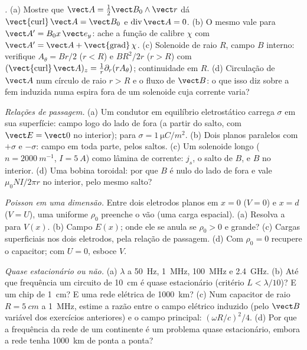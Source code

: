 \begin{exercise}[$\star\star$]\label{exo:b2:maxwell-equations:5}
\emph{.} (a) Mostre que $\vect A = \tfrac12\vect B_0\wedge\vect r$
dá $\operatorname{\vect{curl}}\vect A = \vect B_0$ e $\operatorname{div}\vect A = 0$.
(b) O mesmo vale para $\vect A' = B_0x\,\vect e_y$: ache a função de calibre $\chi$ com
$\vect A' = \vect A + \operatorname{\vect{grad}}\chi$. (c) Solenoide de raio $R$,
campo $B$ interno: verifique $A_\theta = Br/2$ ($r < R$) e $BR^2/2r$ ($r > R$)
com $(\operatorname{\vect{curl}}\vect A)_z = \frac1r\partial_r(rA_\theta)$; continuidade em $R$.
(d) Circulação de $\vect A$ num círculo de raio $r > R$ e o fluxo de
$\vect B$: o que isso diz sobre a fem induzida numa espira fora de um
solenoide cuja corrente varia?
\end{exercise}

\begin{exercise}[$\star\star$]\label{exo:b2:maxwell-equations:6}
\emph{Relações de passagem.} (a) Um condutor em equilíbrio
eletrostático carrega $\sigma$ em sua superfície: campo logo do lado de fora (a partir do
salto, com $\vect E = \vect 0$ no interior); para $\sigma = \qty{1}{\micro C/m^2}$. (b) Dois
planos paralelos com $+\sigma$ e $-\sigma$: campo em toda parte, pelos saltos.
(c) Um solenoide longo ($n = \qty{2000}{m^{-1}}$, $I = \qty{5}{A}$) como lâmina de
corrente: $j_s$, o salto de $B$, e $B$ no interior. (d) Uma bobina toroidal: por que $B$ é
nulo do lado de fora e vale $\mu_0NI/2\pi r$ no interior, pelo mesmo salto?
\end{exercise}

\begin{exercise}[$\star\star$]\label{exo:b2:maxwell-equations:7}
\emph{Poisson em uma dimensão.} Entre dois eletrodos planos em $x = 0$
($V = 0$) e $x = d$ ($V = U$), uma  uniforme $\rho_0$ preenche o
vão (uma carga espacial). (a) Resolva a  para $V(x)$. (b) Campo
$E(x)$; onde ele se anula se $\rho_0 > 0$ e grande? (c) Cargas superficiais nos
dois eletrodos, pela relação de passagem. (d) Com $\rho_0 = 0$
recupere o capacitor; com $U = 0$, esboce $V$.
\end{exercise}

\begin{exercise}[$\star\star$]\label{exo:b2:maxwell-equations:8}
\emph{Quase estacionário ou não.} (a) $\lambda$ a \qty{50}{Hz}, \qty{1}{MHz},
\qty{100}{MHz} e \qty{2.4}{GHz}. (b) Até que frequência um circuito de \qty{10}{cm}
é quase estacionário (critério $L < \lambda/10$)? E um chip de \qty{1}{cm}? E uma
rede elétrica de \qty{1000}{km}? (c) Num capacitor de raio $R = \qty{5}{cm}$ a
\qty{1}{MHz}, estime a razão entre o campo elétrico induzido (pelo
$\vect B$ variável dos exercícios anteriores) e o campo principal: $(\omega R/c)^2
/4$. (d) Por que a frequência da rede de um continente é um problema
quase estacionário, embora a rede tenha \qty{1000}{km} de ponta a ponta?
\end{exercise}

